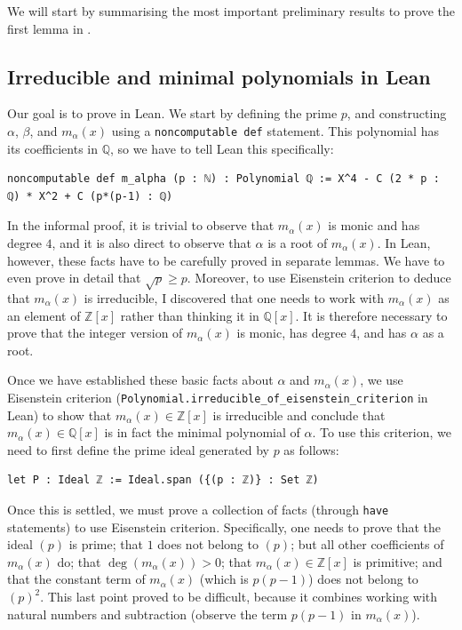 \documentclass[a4paper,11pt]{article}
\theoremstyle{plain}
\newcommand{\Q}{\ensuremath{\mathbb{Q}}} %
\newcommand{\Z}{\ensuremath{\mathbb{Z}}} %
\begin{document}
	 We will start by summarising the most important preliminary results to prove the first lemma in .
	 
	 \subsection{Irreducible and minimal polynomials in Lean}
	 
	Our goal is to prove  in Lean. We start by defining the prime $p$, and constructing $\alpha$, $\beta$, and $m_\alpha(x)$ using a \lstinline|noncomputable def| statement. This polynomial has its coefficients in $\Q$, so we have to tell Lean this specifically:\\
	
	\begin{lstlisting}[caption={Definition of $m_\alpha(x)$.}]
		noncomputable def m_alpha (p : ℕ) : Polynomial ℚ := X^4 - C (2 * p : ℚ) * X^2 + C (p*(p-1) : ℚ)
	\end{lstlisting}
	
	In the informal proof, it is trivial to observe that $m_\alpha(x)$ is monic and has degree $4$, and it is also direct to observe that $\alpha$ is a root of $m_\alpha(x)$. In Lean, however, these facts have to be carefully proved in separate lemmas. We have to even prove in detail that $\sqrt{p}\geq p$. Moreover, to use Eisenstein criterion to deduce that $m_\alpha(x)$ is irreducible, I discovered that one needs to work with $m_\alpha(x)$ as an element of $\Z[x]$ rather than thinking it in $\Q[x]$. It is therefore necessary to prove that the integer version of $m_\alpha(x)$ is monic, has degree $4$, and has $\alpha$ as a root.
	
	Once we have established these basic facts about $\alpha$ and $m_\alpha(x)$, we use Eisenstein criterion (\lstinline|Polynomial.irreducible_of_eisenstein_criterion| in Lean) to show that $m_\alpha(x)\in\Z[x]$ is irreducible and conclude that $m_\alpha(x)\in\Q[x]$ is in fact the minimal polynomial of $\alpha$. To use this criterion, we need to first define the prime ideal generated by $p$ as follows:\\
	
	\begin{lstlisting}[caption={Definition of the prime ideal $\mathcal{P}:=(p)$.}]
		let P : Ideal ℤ := Ideal.span ({(p : ℤ)} : Set ℤ)
	\end{lstlisting}
	
	Once this is settled, we must prove a collection of facts (through \lstinline|have| statements) to use Eisenstein criterion. Specifically, one needs to prove that the ideal $(p)$ is prime; that $1$ does not belong to $(p)$; but all other coefficients of $m_\alpha(x)$ do; that $\deg(m_\alpha(x))>0$; that $m_\alpha(x)\in\Z[x]$ is primitive; and that the constant term of $m_\alpha(x)$ (which is $p(p-1)$) does not belong to $(p)^2$. This last point proved to be difficult, because it combines working with natural numbers and subtraction (observe the term $p(p-1)$ in $m_\alpha(x)$). 
	
\end{document}
